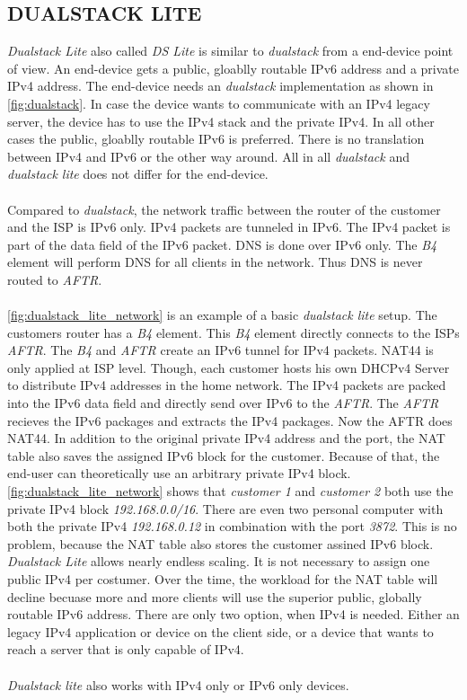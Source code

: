 \documentclass[format=sigconf, natbib=true, nonacm=true]{acmart}
\begin{document}
    \subsection{DUALSTACK LITE}
    \textit{Dualstack Lite} also called \textit{DS Lite} is similar to \textit{dualstack} from a end-device point of view. An end-device gets a public, gloablly routable IPv6 address and a private IPv4 address. The end-device needs an \textit{dualstack} implementation as shown in \ref{fig:dualstack}. In case the device wants to communicate with an IPv4 legacy server, the device has to use the IPv4 stack and the private IPv4. In all other cases the public, gloablly routable IPv6 is preferred. There is no translation between IPv4 and IPv6 or the other way around. All in all \textit{dualstack} and \textit{dualstack lite} does not differ for the end-device.\\\\Compared to \textit{dualstack}, the network traffic between the router of the customer and the ISP is IPv6 only. IPv4 packets are tunneled in IPv6. The IPv4 packet is part of the data field of the IPv6 packet. DNS is done over IPv6 only. The \textit{B4} element will perform DNS for all clients in the network. Thus DNS is never routed to \textit{AFTR}.\\\\ \ref{fig:dualstack_lite_network} is an example of a basic \textit{dualstack lite} setup. The customers router has a \textit{B4} element. This \textit{B4} element directly connects to the ISPs \textit{AFTR}. The \textit{B4} and \textit{AFTR} create an IPv6 tunnel for IPv4 packets. NAT44 is only applied at ISP level. Though, each customer hosts his own DHCPv4 Server to distribute IPv4 addresses in the home network. The IPv4 packets are packed into the IPv6 data field and directly send over IPv6 to the \textit{AFTR}. The \textit{AFTR} recieves the IPv6 packages and extracts the IPv4 packages. Now the AFTR does NAT44. In addition to the original private IPv4 address and the port, the NAT table also saves the assigned IPv6 block for the customer. Because of that, the end-user can theoretically use an arbitrary private IPv4 block\cite{rfc6333}. \ref{fig:dualstack_lite_network} shows that \textit{customer 1} and \textit{customer 2} both use the private IPv4 block \textit{192.168.0.0/16}. There are even two personal computer with both the private IPv4 \textit{192.168.0.12} in combination with the port \textit{3872}. This is no problem, because the NAT table also stores the customer assined IPv6 block. \textit{Dualstack Lite} allows nearly endless scaling. It is not necessary to assign one public IPv4 per costumer. Over the time, the workload for the NAT table will decline becuase more and more clients will use the superior public, globally routable IPv6 address. There are only two option, when IPv4 is needed. Either an legacy IPv4 application or device on the client side, or a device that wants to reach a server that is only capable of IPv4.\\\\\textit{Dualstack lite} also works with IPv4 only or IPv6 only devices. 
\end{document}
